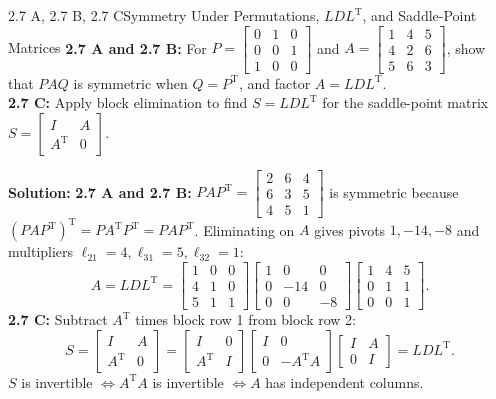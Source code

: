 \documentclass[11pt,a4paper,openany,oneside]{book}
\def\vect#1{#1}%
\def\mathbf#1{#1}%
\newcommand{\vect}[1]{\mathbf{#1}}
\newcommand{\T}{\mathrm{T}}
\numberwithin{equation}{chapter}
\begin{document}
\begin{example}{2.7 A, 2.7 B, 2.7 C}{Symmetry Under Permutations, $LDL^\T$, and Saddle-Point Matrices}
\textbf{2.7 A and 2.7 B:} For $P = \begin{bmatrix}0&1&0\\0&0&1\\1&0&0\end{bmatrix}$ and $A = \begin{bmatrix}1&4&5\\4&2&6\\5&6&3\end{bmatrix}$, show that $PAQ$ is symmetric when $Q = P^\T$, and factor $A = LDL^\T$.\\
\textbf{2.7 C:} Apply block elimination to find $S = LDL^\T$ for the saddle-point matrix $S = \begin{bmatrix}I & A\\A^\T & \vect{0}\end{bmatrix}$.
\end{example}
\textbf{Solution:}
\textbf{2.7 A and 2.7 B:} $PA P^\T = \begin{bmatrix}2&6&4\\6&3&5\\4&5&1\end{bmatrix}$ is symmetric because $(PAP^\T)^\T = PA^\T P^\T = PAP^\T$. Eliminating on $A$ gives pivots $1, -14, -8$ and multipliers $\ell_{21}=4, \ell_{31}=5, \ell_{32}=1$:
\[
A = LDL^\T = \begin{bmatrix}1&0&0\\4&1&0\\5&1&1\end{bmatrix}\begin{bmatrix}1&0&0\\0&-14&0\\0&0&-8\end{bmatrix}\begin{bmatrix}1&4&5\\0&1&1\\0&0&1\end{bmatrix}.
\]
\textbf{2.7 C:} Subtract $A^\T$ times block row 1 from block row 2:
\[
S = \begin{bmatrix}I & A\\A^\T & \vect{0}\end{bmatrix} = \begin{bmatrix}I & \vect{0}\\A^\T & I\end{bmatrix}\begin{bmatrix}I & \vect{0}\\\vect{0} & -A^\T A\end{bmatrix}\begin{bmatrix}I & A\\\vect{0} & I\end{bmatrix} = LDL^\T.
\]
$S$ is invertible $\iff A^\T A$ is invertible $\iff A$ has independent columns.
\end{document}
